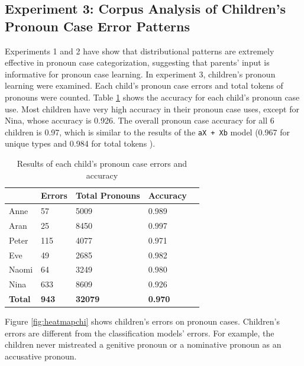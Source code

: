 \subsection{Experiment 3: Corpus Analysis of Children's Pronoun Case Error Patterns}
Experiments 1 and 2 have show that distributional patterns are extremely effective in pronoun case categorization, suggesting that parents' input is informative for pronoun case learning. In experiment 3, children's pronoun learning were examined. Each child's pronoun case errors and total tokens of pronouns were counted. Table \ref{table:5758} shows the accuracy for each child's pronoun case use. Most children have very high accuracy in their pronoun case uses, except for Nina, whose accuracy is 0.926. The overall pronoun case accuracy for all 6 children is 0.97, which is similar to the results of the \texttt{aX + Xb} model (0.967 for unique types and 0.984 for total tokens ). 
\FloatBarrier
\begin{table}[!h]
\centering
\caption{Results of each child's pronoun case errors and accuracy}
\label{table:5758}
\begin{tabular}{lllll}
\hline
 & \textbf{Errors} & \textbf{Total Pronouns} & \textbf{Accuracy} \\ \hline
Anne  & 57 & 5009 & 0.989 \\
Aran & 25 & 8450 & 0.997 \\
Peter& 115 & 4077 & 0.971 \\
Eve  & 49 & 2685 & 0.982 \\
Naomi  & 64 & 3249 & 0.980 \\
Nina  & 633 & 8609 & 0.926 \\
\textbf{Total} & \textbf{943} & \textbf{32079} & \textbf{0.970} \\ \hline
\end{tabular}
\end{table}
\FloatBarrier

Figure \ref{fig:heatmapchi} shows children's errors on pronoun cases. Children's errors are different from the classification models' errors. For example, the children never mistreated a genitive pronoun or a nominative pronoun as an accusative pronoun. 

